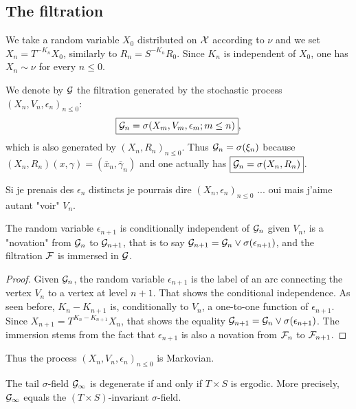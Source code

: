 \documentclass[12pt,a4paper]{article}
\begin{document}
\subsection{The filtration} 

We take a random variable $X_0$ distributed on $\mathcal{X}$ according to $\nu$ 
and we set $\boxed{X_n = T^{-K_n} X_0}$, similarly to $R_n = S^{-K_n} R_0$. 
Since $K_n$ is independent of $X_0$, one has $X_n \sim \nu$ for every $n \leq 0$.

We denote by $\mathcal{G}$ the filtration generated by the stochastic process 
${(X_n, V_n, \epsilon_n)}_{n \leq 0}$:
$$
\boxed{\mathcal{G}_n = \sigma(X_m, V_m, \epsilon_m; m \leq n)}, 
$$
 which is also generated by ${(X_n, R_n)}_{n \leq 0}$. 
 Thus $\mathcal{G}_n = \sigma(\xi_n)$ because $(X_n,R_n)(x,\gamma) = (\bar x_n, \bar\gamma_n)$ 
and one actually has 
$\boxed{\mathcal{G}_n = \sigma(X_n, R_n)}$.

\begin{remark}
Si je prenais des $\epsilon_n$ distincts je pourrais dire 
${(X_n, \epsilon_n)}_{n \leq 0}$ ... oui mais j'aime autant "voir" $V_n$.
\end{remark}

\begin{lemma}
The random variable $\epsilon_{n+1}$ is conditionally independent of $\mathcal{G}_n$ 
given $V_n$, is 
a "novation" from $\mathcal{G}_n$ to $\mathcal{G}_{n+1}$, that is 
to say $\mathcal{G}_{n+1} = \mathcal{G}_n \vee \sigma(\epsilon_{n+1})$, and  
the filtration $\mathcal{F}$ is immersed in $\mathcal{G}$. 
\end{lemma}

\begin{proof}
Given $\mathcal{G}_n$, the random variable $\epsilon_{n+1}$ is the label of an 
arc connecting the vertex $V_n$ to a vertex at level $n+1$. 
That shows the conditional independence. 
As seen before, $K_{n}-K_{n+1}$ is, conditionally to $V_n$, 
a one-to-one function of $\epsilon_{n+1}$. Since 
$X_{n+1} = T^{K_{n}-K_{n+1}}X_n$, that shows the equality 
$\mathcal{G}_{n+1} = \mathcal{G}_n \vee \sigma(\epsilon_{n+1})$. 
The immersion stems from the fact that 
 $\epsilon_{n+1}$ is also a novation from $\mathcal{F}_n$ to $\mathcal{F}_{n+1}$.  
\end{proof}

Thus the process ${(X_n, V_n, \epsilon_n)}_{n \leq 0}$ is Markovian. 


\begin{ppsition}\label{ppsition:tailfield}
The tail $\sigma$-field $\mathcal{G}_\infty$ is degenerate if and only if $T \times S$ is ergodic. 
More precisely, $\mathcal{G}_\infty$ equals  the $(T\times S)$-invariant $\sigma$-field. 
\end{ppsition}
 
\end{document}
